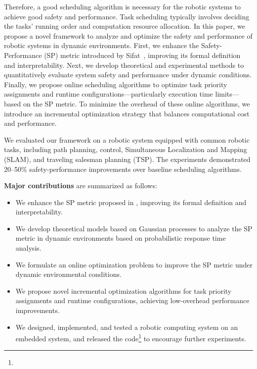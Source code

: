     Therefore, a good scheduling algorithm is necessary for the robotic systems to achieve good safety and performance. Task scheduling typically involves deciding the tasks' running order and computation resource allocation.
    In this paper, we propose a novel framework to analyze and optimize the safety and performance of robotic systems in dynamic environments. First, we enhance the Safety-Performance (SP) metric introduced by Sifat~\cite{Ash23RAL}, improving its formal definition and interpretability. Next, we develop theoretical and experimental methods to quantitatively evaluate system safety and performance under dynamic conditions. 
    Finally, we propose online scheduling algorithms to optimize task priority assignments and runtime configurations—particularly execution time limits—based on the SP metric. 
    To minimize the overhead of these online algorithms, we introduce an incremental optimization strategy that balances computational cost and performance. 
    
    We evaluated our framework on a robotic system equipped with common robotic tasks, including path planning, control, Simultaneous Localization and Mapping (SLAM), and traveling salesman planning (TSP). The experiments demonstrated 20–50\% safety-performance improvements over baseline scheduling algorithms.
	
	
	\textbf{Major contributions} are summarized as follows:
	\begin{itemize}
		\item We enhance the SP metric proposed in \cite{Ash23RAL}, improving its formal definition and interpretability.
        \item We develop theoretical models based on Gaussian processes to analyze the SP metric in dynamic environments based on probabilistic response time analysis. 
        \item We formulate an online optimization problem to improve the SP metric under dynamic environmental conditions. 
        \item We propose novel incremental optimization algorithms for task priority assignments and runtime configurations, achieving low-overhead performance improvements. 
        \item We designed, implemented, and tested a robotic computing system on an embedded system, and released the code\footnote{\githubLink{}} to encourage further experiments.
	\end{itemize}

	
	